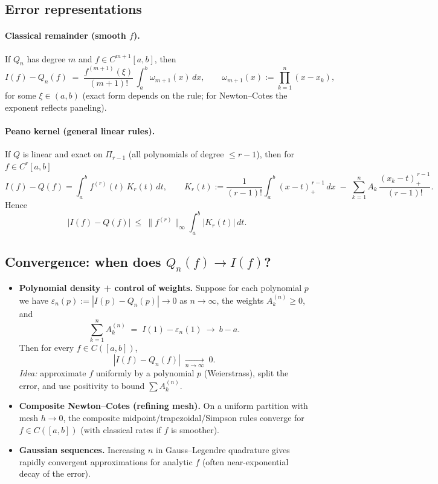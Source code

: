 \documentclass[12pt,a4paper]{article}
\theoremstyle{plain}
\theoremstyle{definition}
\theoremstyle{remark}
\theoremstyle{remark}
\begin{document}
\bigskip

\subsection*{Error representations}

\paragraph{Classical remainder (smooth $f$).}
If $Q_n$ has degree $m$ and $f\in C^{m+1}[a,b]$, then
\[
I(f)-Q_n(f) \;=\; \frac{f^{(m+1)}(\xi)}{(m+1)!}\,\int_a^b \omega_{m+1}(x)\,dx,
\qquad
\omega_{m+1}(x):=\prod_{k=1}^n (x-x_k),
\]
for some $\xi\in(a,b)$ (exact form depends on the rule; for Newton--Cotes the exponent reflects paneling).

\paragraph{Peano kernel (general linear rules).}
If $Q$ is linear and exact on $\Pi_{r-1}$ (all polynomials of degree $\le r-1$), then for $f\in C^r[a,b]$
\[
I(f)-Q(f)=\int_a^b f^{(r)}(t)\,K_r(t)\,dt,
\qquad
K_r(t):=\frac{1}{(r-1)!}\int_a^b (x-t)_{+}^{\,r-1}\,dx \;-\; \sum_{k=1}^n A_k\,\frac{(x_k-t)_{+}^{\,r-1}}{(r-1)!}.
\]
Hence
\[
|I(f)-Q(f)|\ \le\ \|f^{(r)}\|_\infty \int_a^b |K_r(t)|\,dt.
\]

\bigskip

\subsection*{Convergence: when does $Q_n(f)\to I(f)$?}

\begin{itemize}\setlength{\itemsep}{0.6em}
	\item \textbf{Polynomial density + control of weights.}
	Suppose for each polynomial $p$ we have $\varepsilon_n(p):=|I(p)-Q_n(p)|\to0$ as $n\to\infty$,
	the weights $A_k^{(n)}\ge0$, and
	\[
	\sum_{k=1}^n A_k^{(n)} \;=\; I(1)-\varepsilon_n(1)\ \longrightarrow\ b-a .
	\]
	Then for every $f\in C([a,b])$,
	\[
	|I(f)-Q_n(f)| \;\xrightarrow[n\to\infty]{}\; 0.
	\]
	\emph{Idea:} approximate $f$ uniformly by a polynomial $p$ (Weierstrass), split the error, and use positivity to bound $\sum A_k^{(n)}$.
	\item \textbf{Composite Newton--Cotes (refining mesh).}
	On a uniform partition with mesh $h\to0$, the composite midpoint/trapezoidal/Simpson rules converge for $f\in C([a,b])$ (with classical rates if $f$ is smoother).
	\item \textbf{Gaussian sequences.}
	Increasing $n$ in Gauss--Legendre quadrature gives rapidly convergent approximations for analytic $f$ (often near-exponential decay of the error).
\end{itemize}
\end{document}
